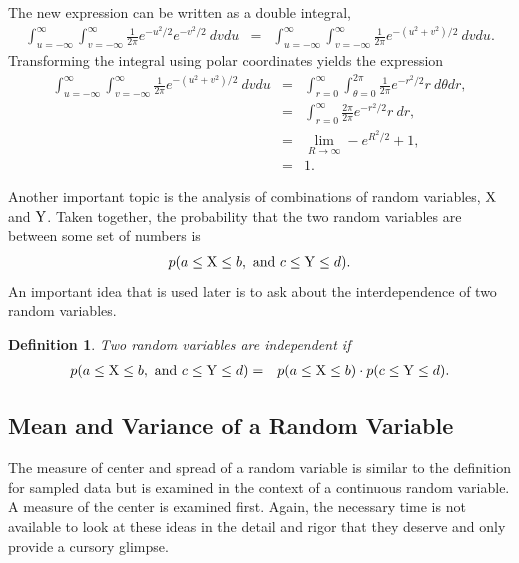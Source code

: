 \documentclass[12pt]{article}
\newtheorem{definition}{Definition}[section]
\begin{document}
The new expression can be written as a double integral,
\begin{eqnarray*}
\int^\infty_{u=-\infty} \int^\infty_{v=-\infty} 
    \frac{1}{2\pi} e^{-u^2/2} e^{-v^2/2} ~ dv du & = & 
\int^\infty_{u=-\infty} \int^\infty_{v=-\infty} 
    \frac{1}{2\pi} e^{-(u^2+v^2)/2} ~ dv du.
\end{eqnarray*}
Transforming the integral using polar coordinates yields the expression
\begin{eqnarray*}
\int^\infty_{u=-\infty} \int^\infty_{v=-\infty} 
    \frac{1}{2\pi} e^{-(u^2+v^2)/2} ~ dv du & = & 
\int^\infty_{r=0} \int^{2\pi}_{\theta=0} \frac{1}{2\pi} e^{-r^2/2} r ~ d\theta dr, \\
& = & 
\int^\infty_{r=0}  \frac{2\pi}{2\pi} e^{-r^2/2} r ~ dr, \\
& = & \lim_{R \rightarrow \infty} -e^{R^2/2} + 1, \\
& = & 1.
\end{eqnarray*}


\fi


Another important topic is the analysis of combinations of random
variables, ${\rm X}$ and ${\rm Y}$. Taken together, the probability
that the two random variables are between some set of numbers is
\begin{eqnarray*}
  p( a \leq {\rm X} \leq b,~\mathrm{and}~c \leq {\rm Y} \leq d ).
\end{eqnarray*}
An important idea that is used later is to ask about the
interdependence of two random variables.


\begin{definition}
Two random variables are independent if 
\begin{eqnarray*}
  p( a \leq {\rm X} \leq b,~\mathrm{and}~c \leq {\rm Y} \leq d ) 
  & = & 
  p( a \leq {\rm X} \leq b) \cdot p(c \leq {\rm Y} \leq d ).
\end{eqnarray*}  
\end{definition}

\subsection{Mean and Variance of a Random Variable}

The measure of center and spread of a random variable is similar to
the definition for sampled data but is examined in the context of a
continuous random variable.  A measure of the center is examined
first.  Again, the necessary time is not available to look at these
ideas in the detail and rigor that they deserve and only provide a
cursory glimpse.
\end{document}

